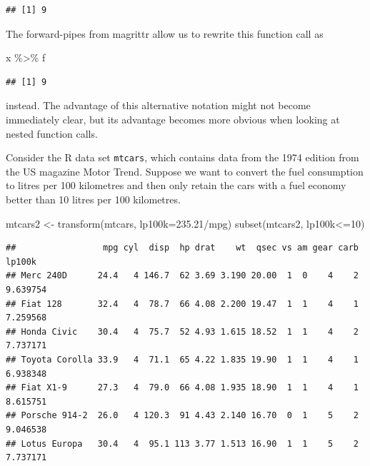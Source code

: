 \documentclass[
]{book}
\newenvironment{Shaded}{\begin{snugshade}}{\end{snugshade}}
\newcommand{\AttributeTok}[1]{\textcolor[rgb]{0.77,0.63,0.00}{#1}}
\newcommand{\DecValTok}[1]{\textcolor[rgb]{0.00,0.00,0.81}{#1}}
\newcommand{\FloatTok}[1]{\textcolor[rgb]{0.00,0.00,0.81}{#1}}
\newcommand{\FunctionTok}[1]{\textcolor[rgb]{0.00,0.00,0.00}{#1}}
\newcommand{\NormalTok}[1]{#1}
\newcommand{\OtherTok}[1]{\textcolor[rgb]{0.56,0.35,0.01}{#1}}
\newcommand{\SpecialCharTok}[1]{\textcolor[rgb]{0.00,0.00,0.00}{#1}}
\begin{document}
\begin{verbatim}
## [1] 9
\end{verbatim}

The forward-pipes from magrittr allow us to rewrite this function call as

\begin{Shaded}
\begin{Highlighting}[]
\NormalTok{x }\SpecialCharTok{\%\textgreater{}\%}\NormalTok{ f}
\end{Highlighting}
\end{Shaded}

\begin{verbatim}
## [1] 9
\end{verbatim}

instead. The advantage of this alternative notation might not become immediately clear, but its advantage becomes more obvious when looking at nested function calls.

Consider the R data set \texttt{mtcars}, which contains data from the 1974 edition from the US magazine Motor Trend. Suppose we want to convert the fuel consumption to litres per 100 kilometres and then only retain the cars with a fuel economy better than 10 litres per 100 kilometres.

\begin{Shaded}
\begin{Highlighting}[]
\NormalTok{mtcars2 }\OtherTok{\textless{}{-}} \FunctionTok{transform}\NormalTok{(mtcars, }\AttributeTok{lp100k=}\FloatTok{235.21}\SpecialCharTok{/}\NormalTok{mpg)}
\FunctionTok{subset}\NormalTok{(mtcars2, lp100k}\SpecialCharTok{\textless{}=}\DecValTok{10}\NormalTok{)}
\end{Highlighting}
\end{Shaded}

\begin{verbatim}
##                 mpg cyl  disp  hp drat    wt  qsec vs am gear carb   lp100k
## Merc 240D      24.4   4 146.7  62 3.69 3.190 20.00  1  0    4    2 9.639754
## Fiat 128       32.4   4  78.7  66 4.08 2.200 19.47  1  1    4    1 7.259568
## Honda Civic    30.4   4  75.7  52 4.93 1.615 18.52  1  1    4    2 7.737171
## Toyota Corolla 33.9   4  71.1  65 4.22 1.835 19.90  1  1    4    1 6.938348
## Fiat X1-9      27.3   4  79.0  66 4.08 1.935 18.90  1  1    4    1 8.615751
## Porsche 914-2  26.0   4 120.3  91 4.43 2.140 16.70  0  1    5    2 9.046538
## Lotus Europa   30.4   4  95.1 113 3.77 1.513 16.90  1  1    5    2 7.737171
\end{verbatim}
\end{document}
